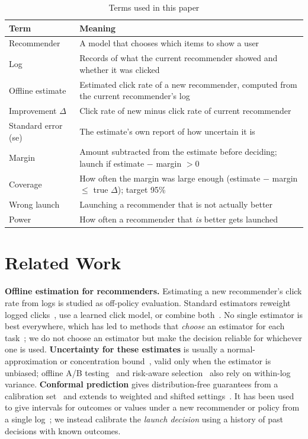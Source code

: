 \documentclass[conference]{IEEEtran}
\begin{document}
\begin{table}[t]
\centering
\caption{Terms used in this paper}
\label{tab:terms}
\small
\begin{tabular}{p{}p{}}
\toprule
Term & Meaning \\
\midrule
Recommender & A model that chooses which items to show a user \\
Log & Records of what the current recommender showed and whether it was clicked \\
Offline estimate & Estimated click rate of a new recommender, computed from the current recommender's log \\
Improvement $\Delta$ & Click rate of new minus click rate of current recommender \\
Standard error (se) & The estimate's own report of how uncertain it is \\
Margin & Amount subtracted from the estimate before deciding; launch if estimate $-$ margin $>0$ \\
Coverage & How often the margin was large enough (estimate $-$ margin $\le$ true $\Delta$); target 95\% \\
Wrong launch & Launching a recommender that is not actually better \\
Power & How often a recommender that \emph{is} better gets launched \\
\bottomrule
\end{tabular}
\end{table}

\section{Related Work}
\textbf{Offline estimation for recommenders.} Estimating a new recommender's click rate from logs is studied as off-policy evaluation. Standard estimators reweight logged clicks~\cite{horvitz1952,swaminathan2015snips}, use a learned click model, or combine both~\cite{dudik2011dr,wang2017switch}. No single estimator is best everywhere, which has led to methods that \emph{choose} an estimator for each task~\cite{udagawa2023pasif,felicioni2024autoope}; we do not choose an estimator but make the decision reliable for whichever one is used. \textbf{Uncertainty for these estimates} is usually a normal-approximation or concentration bound~\cite{thomas2015hcope,maurer2009eb}, valid only when the estimator is unbiased; offline A/B testing~\cite{gilotte2018offlineab} and risk-aware selection~\cite{kiyohara2024sharpe} also rely on within-log variance. \textbf{Conformal prediction} gives distribution-free guarantees from a calibration set~\cite{vovk2005alrw,lei2018distfree} and extends to weighted and shifted settings~\cite{tibshirani2019covshift,barber2023beyond}. It has been used to give intervals for outcomes or values under a new recommender or policy from a single log~\cite{taufiq2022copp,zhang2023copp,foffano2023conformal}; we instead calibrate the \emph{launch decision} using a history of past decisions with known outcomes.
\end{document}
